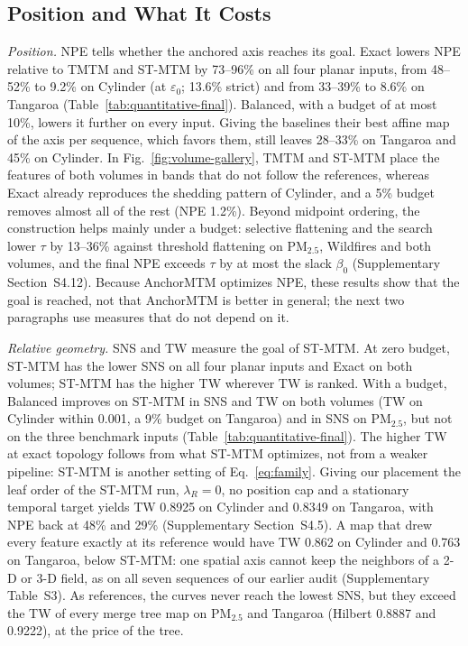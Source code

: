 \subsection{Position and What It Costs}\label{sec:reference-results}
\emph{Position.} NPE tells whether the anchored axis reaches its goal. Exact lowers NPE relative to TMTM and ST-MTM by 73--96\% on all four planar inputs, from 48--52\% to 9.2\% on Cylinder (at $\varepsilon_0$; 13.6\% strict) and from 33--39\% to 8.6\% on Tangaroa (Table~\ref{tab:quantitative-final}). Balanced, with a budget of at most 10\%, lowers it further on every input. Giving the baselines their best affine map of the axis per sequence, which favors them, still leaves 28--33\% on Tangaroa and 45\% on Cylinder. In Fig.~\ref{fig:volume-gallery}, TMTM and ST-MTM place the features of both volumes in bands that do not follow the references, whereas Exact already reproduces the shedding pattern of Cylinder, and a 5\% budget removes almost all of the rest (NPE 1.2\%). Beyond midpoint ordering, the construction helps mainly under a budget: selective flattening and the search lower $\tau$ by 13--36\% against threshold flattening on PM$_{2.5}$, Wildfires and both volumes, and the final NPE exceeds $\tau$ by at most the slack $\beta_0$ (Supplementary Section~S4.12). Because AnchorMTM optimizes NPE, these results show that the goal is reached, not that AnchorMTM is better in general; the next two paragraphs use measures that do not depend on it.

\emph{Relative geometry.} SNS and TW measure the goal of ST-MTM. At zero budget, ST-MTM has the lower SNS on all four planar inputs and Exact on both volumes; ST-MTM has the higher TW wherever TW is ranked. With a budget, Balanced improves on ST-MTM in SNS and TW on both volumes (TW on Cylinder within 0.001, a 9\% budget on Tangaroa) and in SNS on PM$_{2.5}$, but not on the three benchmark inputs (Table~\ref{tab:quantitative-final}). The higher TW at exact topology follows from what ST-MTM optimizes, not from a weaker pipeline: ST-MTM is another setting of Eq.~\ref{eq:family}. Giving our placement the leaf order of the ST-MTM run, $\lambda_R=0$, no position cap and a stationary temporal target yields TW 0.8925 on Cylinder and 0.8349 on Tangaroa, with NPE back at 48\% and 29\% (Supplementary Section~S4.5). A map that drew every feature exactly at its reference would have TW 0.862 on Cylinder and 0.763 on Tangaroa, below ST-MTM: one spatial axis cannot keep the neighbors of a 2-D or 3-D field, as on all seven sequences of our earlier audit (Supplementary Table~S3). As references, the curves never reach the lowest SNS, but they exceed the TW of every merge tree map on PM$_{2.5}$ and Tangaroa (Hilbert 0.8887 and 0.9222), at the price of the tree.

